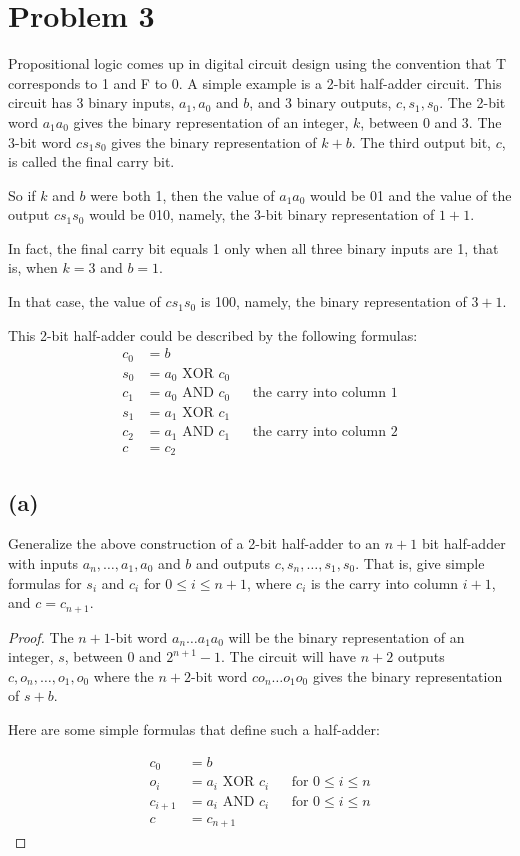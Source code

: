\documentclass[14pt]{extarticle}
\begin{document}
\section{Problem 3}
Propositional logic comes up in digital circuit design using the convention that T corresponds to 1 and F to 0. A simple example is a 2-bit half-adder circuit. This circuit has 3 binary inputs, $a_1, a_0$ and $b$, and 3 binary outputs, $c, s_1, s_0$. The 2-bit word $a_1 a_0$ gives the binary representation of an integer, $k$, between 0 and 3. The 3-bit word $c s_1 s_0$ gives the binary representation of $k + b$. The third output bit, $c$, is called the final carry bit.

So if $k$ and $b$ were both 1, then the value of $a_1 a_0$ would be 01 and the value of the output $c s_1 s_0$ would be 010, namely, the 3-bit binary representation of $1 + 1$.

In fact, the final carry bit equals 1 only when all three binary inputs are 1, that is, when $k = 3$ and $b = 1$.

In that case, the value of $c s_1 s_0$ is 100, namely, the binary representation of $3 + 1$.

This 2-bit half-adder could be described by the following formulas:
\begin{align*}
c_0 & =  b & &\\
s_0 & =  a_0 \text{ XOR } c_0 & &\\
c_1 & =  a_0 \text{ AND } c_0 & &\text{the carry into column 1}\\
s_1 & =  a_1 \text{ XOR } c_1 & &\\
c_2 & =  a_1 \text{ AND } c_1 & &\text{the carry into column 2}\\
c   & =  c_2 & &
\end{align*}

\subsection{(a)}
Generalize the above construction of a 2-bit half-adder to an $n+1$ bit half-adder with inputs $a_n, \ldots, a_1, a_0$ and $b$ and outputs $c, s_n , \ldots, s_1, s_0$. That is, give simple formulas for $s_i$ and $c_i$ for $0 \leq i \leq n + 1$, where $c_i$ is the carry into column $i + 1$, and $c  = c_{n + 1}$.
\begin{proof}
The $n + 1$-bit word $a_n \ldots a_1 a_0$ will be the binary representation of an integer, $s$, between 0 and $2^{n+1} - 1$. The circuit will have $n + 2$ outputs $c, o_n, \ldots, o_1, o_0$ where the $n + 2$-bit word $c o_n \ldots o_1 o_0$ gives the binary representation of $s + b$.

Here are some simple formulas that define such a half-adder:

\begin{align*}
c_0 & = b & &\\
o_i & = a_i \text{ XOR } c_i & & \text{for } 0 \leq i \leq n\\
c_{i+1} & = a_i \text{ AND } c_i & & \text{for } 0 \leq i \leq n\\
c & =  c_{n+1} & &
\end{align*}
\end{proof}
\end{document}
